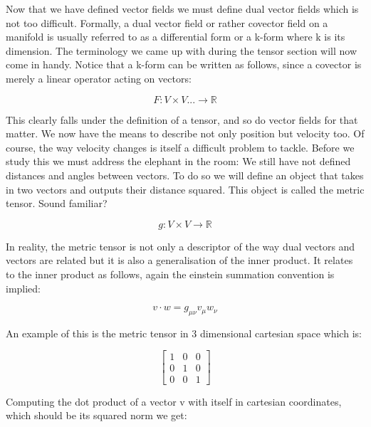 \documentclass{article}
\begin{document}
  Now that we have defined vector fields we must define dual vector fields which is not too difficult. Formally, a dual vector field or rather covector field on a manifold is usually referred to as a differential form or a k-form where k is its dimension. The terminology we came up with during the tensor section will now come in handy. Notice that a k-form can be written as follows, since a covector is merely a linear operator acting on vectors:

  \begin{equation*}
    F: V \times V ... \rightarrow \mathbb R
  \end{equation*}

This clearly falls under the definition of a tensor, and so do vector fields for that matter. We now have the means to describe not only position but velocity too. Of course, the way velocity changes is itself a difficult problem to tackle. Before we study this we must address the elephant in the room: We still have not defined distances and angles between vectors. To do so we will define an object that takes in two vectors and outputs their distance squared. This object is called the metric tensor. Sound familiar? 

  \begin{equation*}
    g: V \times V \rightarrow \mathbb R
  \end{equation*}

In reality, the metric tensor is not only a descriptor of the way dual vectors and vectors are related but it is also a generalisation of the inner product. It relates to the inner product as follows, again the einstein summation convention is implied:

  \begin{equation*}
    v \cdot w = g_{\mu \nu} v_{\mu} w_{\nu}
  \end{equation*}

An example of this is the metric tensor in 3 dimensional cartesian space which is:

\begin{equation*}
  \left[
  \begin{matrix}
    1 & 0 & 0\\
    0 & 1 & 0\\
    0 & 0 & 1
  \end{matrix}
  \right]
\end{equation*}

Computing the dot product of a vector v with itself in cartesian coordinates, which should be its squared norm we get:
\end{document}
